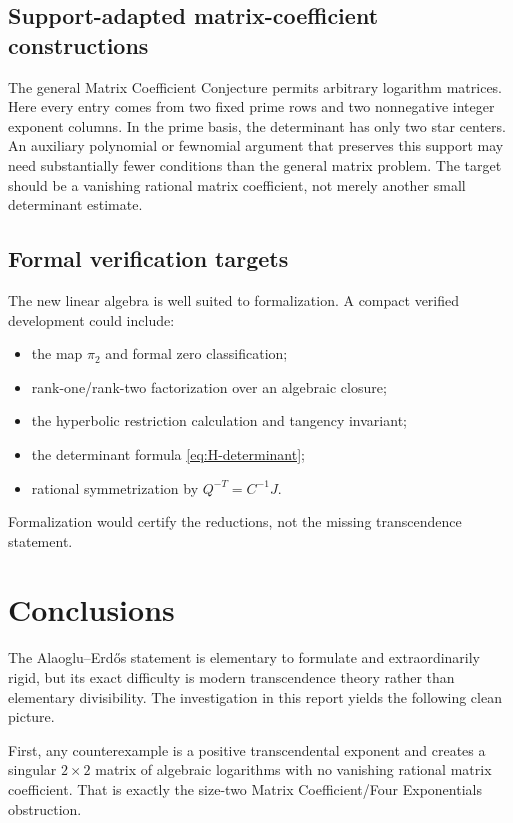 \documentclass[11pt]{article}
\theoremstyle{definition}
\theoremstyle{remark}
\begin{document}
\subsection{Support-adapted matrix-coefficient constructions}

The general Matrix Coefficient Conjecture permits arbitrary logarithm matrices.  Here every
entry comes from two fixed prime rows and two nonnegative integer exponent columns.  In the
prime basis, the determinant has only two star centers.  An auxiliary polynomial or
fewnomial argument that preserves this support may need substantially fewer conditions than
the general matrix problem.  The target should be a vanishing rational matrix coefficient,
not merely another small determinant estimate.

\subsection{Formal verification targets}

The new linear algebra is well suited to formalization.  A compact verified development
could include:
\begin{itemize}
\item the map $\pi_2$ and formal zero classification;
\item rank-one/rank-two factorization over an algebraic closure;
\item the hyperbolic restriction calculation and tangency invariant;
\item the determinant formula \eqref{eq:H-determinant};
\item rational symmetrization by $Q^{-T}=C^{-1}J$.
\end{itemize}
Formalization would certify the reductions, not the missing transcendence statement.

\section{Conclusions}
\label{sec:conclusion}

The Alaoglu--Erd\H{o}s statement is elementary to formulate and extraordinarily rigid, but
its exact difficulty is modern transcendence theory rather than elementary divisibility.
The investigation in this report yields the following clean picture.

First, any counterexample is a positive transcendental exponent and creates a singular
$2\times2$ matrix of algebraic logarithms with no vanishing rational matrix coefficient.
That is exactly the size-two Matrix Coefficient/Four Exponentials obstruction.
\end{document}
